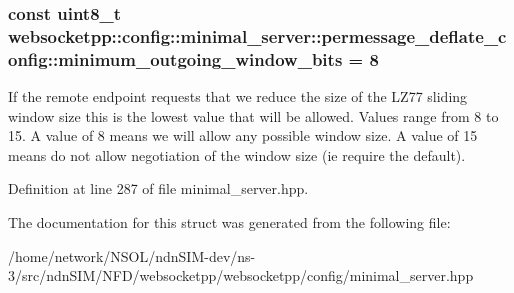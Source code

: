 \subsubsection[{\texorpdfstring{minimum\+\_\+outgoing\+\_\+window\+\_\+bits}{minimum\_outgoing\_window\_bits}}]{\setlength{\rightskip}{0pt plus 5cm}const uint8\+\_\+t websocketpp\+::config\+::minimal\+\_\+server\+::permessage\+\_\+deflate\+\_\+config\+::minimum\+\_\+outgoing\+\_\+window\+\_\+bits = 8\hspace{0.3cm}{\ttfamily [static]}}\hypertarget{structwebsocketpp_1_1config_1_1minimal__server_1_1permessage__deflate__config_a6faed3e781638f77c451d003578d5ca2}{}\label{structwebsocketpp_1_1config_1_1minimal__server_1_1permessage__deflate__config_a6faed3e781638f77c451d003578d5ca2}
If the remote endpoint requests that we reduce the size of the L\+Z77 sliding window size this is the lowest value that will be allowed. Values range from 8 to 15. A value of 8 means we will allow any possible window size. A value of 15 means do not allow negotiation of the window size (ie require the default). 

Definition at line 287 of file minimal\+\_\+server.\+hpp.



The documentation for this struct was generated from the following file\+:\begin{DoxyCompactItemize}
\item 
/home/network/\+N\+S\+O\+L/ndn\+S\+I\+M-\/dev/ns-\/3/src/ndn\+S\+I\+M/\+N\+F\+D/websocketpp/websocketpp/config/minimal\+\_\+server.\+hpp\end{DoxyCompactItemize}
